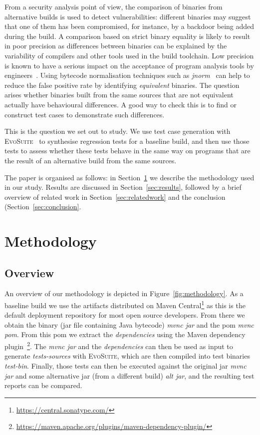 \documentclass[conference]{IEEEtran}
\makeatletter
\newcommand{\evosuite}{\textsc{EvoSuite}\@\xspace}
\makeatother
\begin{document}
From a security analysis point of view, the comparison of binaries from alternative builds is used to detect vulnerabilities: different binaries may suggest that one of them has been compromised, for instance, by a backdoor being added during the build. A comparison based on strict binary equality is likely to result in poor precision as differences between binaries can be explained by the variability of compilers and other tools used in the build toolchain. Low precision is known to have a serious impact on the acceptance of program analysis tools by engineers~\cite{sadowski2018lessons,distefano2019scaling}. Using bytecode normalisation techniques such as \textit{jnorm}~\cite{schott2024JNorm} can help to reduce the false positive rate by identifying \textit{equivalent} binaries. The question arises whether binaries built from the same sources that are not equivalent actually have behavioural differences. A good way to check this is to find or construct test cases to demonstrate such differences.

This is the question we set out to study. We use test case generation with \evosuite~\cite{fraser2011evosuite} to synthesise regression tests for a baseline build, and then use those tests to assess whether these tests behave in the same way on programs that are the result of an alternative  build from the same sources. 

The paper is organised as follows: in Section~\ref{sec:methodology} we describe the methodology used in our study.  Results are discussed in Section~\ref{sec:results}, followed by a brief overview of related work in Section~\ref{sec:relatedwork} and the conclusion (Section~\ref{sec:conclusion}.

\section{Methodology}
\label{sec:methodology}



\subsection{Overview}

An overview of our methodology is depicted in Figure~\ref{fig:methodology}.  As a baseline build we use the artifacts distributed on Maven Central\footnote{\url{https://central.sonatype.com/}} as this is the default deployment repository for most open source developers.  From there we obtain the binary (jar file containing Java bytecode) \textit{mvnc jar} and the pom \textit{mvnc pom}. From this pom we extract the \textit{dependencies} using the Maven dependency plugin~\footnote{\url{https://maven.apache.org/plugins/maven-dependency-plugin/}}.  The \textit{mvnc jar} and the \textit{dependencies} can then be used as input to generate \textit{tests-sources} with \evosuite, which are then compiled into test binaries \textit{test-bin}.  Finally, those tests can then be executed against the original jar \textit{mvnc jar} and some alternative jar (from a different build) \textit{alt jar}, and the resulting test reports can be compared.
\end{document}
